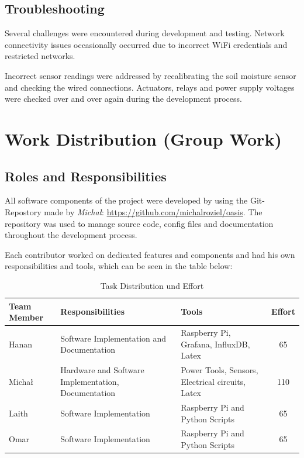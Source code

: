 \documentclass[paper=a4,fontsize=12pt,ngerman]{scrartcl}
\begin{document}
\subsection{Troubleshooting}
Several challenges were encountered during development and testing. Network connectivity issues occasionally occurred due to incorrect  WiFi credentials and restricted networks.

Incorrect sensor readings were addressed by recalibrating the soil moisture sensor and checking the wired connections. Actuators, relays and power supply voltages were checked over and over again during the development process.





\section{Work Distribution (Group Work)}
\subsection{Roles and Responsibilities}
All software components of the project were developed by using the Git-Repostory made by \emph{Micha{\l}}:  \url{https://github.com/michalroziel/oasis}. The repository was used to manage source code, config files and documentation throughout the development process. 

Each contributor worked on dedicated features and components and had his own responsibilities and tools, which can be seen in the table below: 


\begin{table}[H]
    \centering
    \begin{tabular}{|l|p{6cm}|p{5cm}|c|}
    \hline
         \textbf{Team Member} & \textbf{Responsibilities} & \textbf{Tools} & \textbf{Effort}  \\
         \hline
         Hanan & Software Implementation and Documentation & Raspberry Pi, Grafana, InfluxDB, Latex  & 65 \\
         \hline
         Micha{\l} & Hardware and Software Implementation, Documentation  & Power Tools, Sensors, Electrical circuits, Latex  & 110 \\
         \hline
         Laith & Software Implementation & Raspberry Pi and Python Scripts & 65 \\
         \hline
         Omar & Software Implementation & Raspberry Pi and Python Scripts & 65 \\
         \hline
    \end{tabular}
    \caption{Task Distribution und Effort}
    \label{tab:placeholder}
\end{table}
\end{document}
